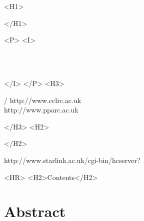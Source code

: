 \begin{htmlonly}
   \xlabel{}
   \begin{rawhtml} <H1> \end{rawhtml}
      \stardoctitle
   \begin{rawhtml} </H1> \end{rawhtml}


   \begin{rawhtml} <P> <I> \end{rawhtml}
   \stardoccategory \stardocnumber \\
   \stardocauthors \\
   \stardocdate
   \begin{rawhtml} </I> </P> <H3> \end{rawhtml}
       /
                        {http://www.cclrc.ac.uk} \\
                        {http://www.pparc.ac.uk} \\
   \begin{rawhtml} </H3> <H2> \end{rawhtml}
   \begin{rawhtml} </H2> \end{rawhtml}
      {http://www.starlink.ac.uk/cgi-bin/hcserver?\stardocsource}\\

  \label{stardoccontents}
  \begin{rawhtml}
    <HR>
    <H2>Contents</H2>
  \end{rawhtml}
  \renewcommand{\latexonlytoc}[0]{}

  \section{Abstract}

\end{htmlonly}

